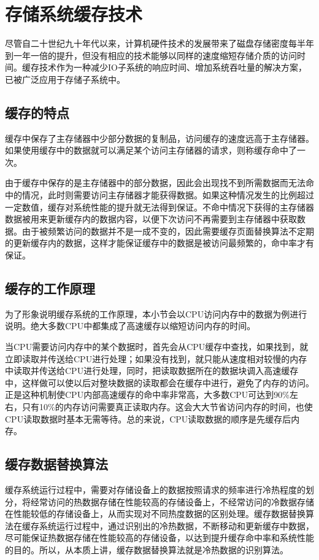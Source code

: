 \section{存储系统缓存技术}
\label{sec:storage_cache_tech}

尽管自二十世纪九十年代以来，计算机硬件技术的发展带来了磁盘存储密度每半年到一年一倍的提升，但没有相应的技术能够以同样的速度缩短存储介质的访问时间。缓存技术\cite{cache2011}作为一种减少IO子系统的响应时间、增加系统吞吐量的解决方案，已被广泛应用于存储子系统中。

\subsection{缓存的特点}
缓存中保存了主存储器中少部分数据的复制品，访问缓存的速度远高于主存储器。如果使用缓存中的数据就可以满足某个访问主存储器的请求，则称缓存命中了一次。

由于缓存中保存的是主存储器中的部分数据，因此会出现找不到所需数据而无法命中的情况，此时则需要访问主存储器才能获得数据。如果这种情况发生的比例超过一定数值，缓存对系统性能的提升就无法得到保证。不命中情况下获得的主存储器数据被用来更新缓存内的数据内容，以便下次访问不再需要到主存储器中获取数据。由于被频繁访问的数据并不是一成不变的，因此需要缓存页面替换算法不定期的更新缓存内的数据，这样才能保证缓存中的数据是被访问最频繁的，命中率才有保证。

\subsection{缓存的工作原理}
为了形象说明缓存系统的工作原理，本小节会以CPU访问内存中的数据为例进行说明。绝大多数CPU中都集成了高速缓存以缩短访问内存的时间。

当CPU需要访问内存中的某个数据时，首先会从CPU缓存中查找，如果找到，就立即读取并传送给CPU进行处理；如果没有找到，就只能从速度相对较慢的内存中读取并传送给CPU进行处理，同时，把读取数据所在的数据块调入高速缓存中，这样做可以使以后对整块数据的读取都会在缓存中进行，避免了内存的访问。正是这种机制使CPU内部高速缓存的命中率非常高，大多数CPU可达到90\%左右，只有10\%的内存访问需要真正读取内存。这会大大节省访问内存的时间，也使CPU读取数据时基本无需等待。总的来说，CPU读取数据的顺序是先缓存后内存。

\subsection{缓存数据替换算法}
缓存系统运行过程中，需要对存储设备上的数据按照请求的频率进行冷热程度的划分，将经常访问的热数据存储在性能较高的存储设备上，不经常访问的冷数据存储在性能较低的存储设备上，从而实现对不同热度数据的区别处理。缓存数据替换算法在缓存系统运行过程中，通过识别出的冷热数据，不断移动和更新缓存中数据，尽可能保证热数据存储在性能较高的存储设备，以达到提升缓存命中率和系统性能的目的。所以，从本质上讲，缓存数据替换算法就是冷热数据的识别算法。

